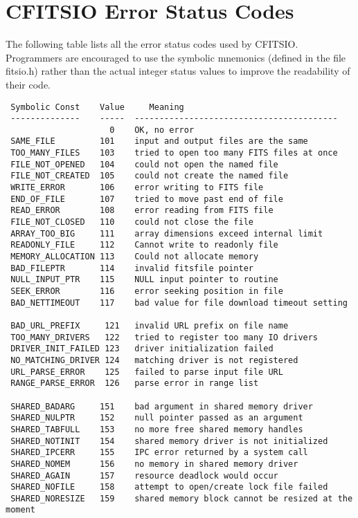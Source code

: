 \documentclass[11pt]{book}
\begin{document}
\chapter{CFITSIO Error Status Codes }

The following table lists all the error status codes used by CFITSIO.
Programmers are encouraged to use the symbolic mnemonics (defined in
the file fitsio.h) rather than the actual integer status values to
improve the readability of their code.

\begin{verbatim}
 Symbolic Const    Value     Meaning
 --------------    -----  -----------------------------------------
                     0    OK, no error
 SAME_FILE         101    input and output files are the same
 TOO_MANY_FILES    103    tried to open too many FITS files at once
 FILE_NOT_OPENED   104    could not open the named file
 FILE_NOT_CREATED  105    could not create the named file
 WRITE_ERROR       106    error writing to FITS file
 END_OF_FILE       107    tried to move past end of file
 READ_ERROR        108    error reading from FITS file
 FILE_NOT_CLOSED   110    could not close the file
 ARRAY_TOO_BIG     111    array dimensions exceed internal limit
 READONLY_FILE     112    Cannot write to readonly file
 MEMORY_ALLOCATION 113    Could not allocate memory
 BAD_FILEPTR       114    invalid fitsfile pointer
 NULL_INPUT_PTR    115    NULL input pointer to routine
 SEEK_ERROR        116    error seeking position in file
 BAD_NETTIMEOUT    117    bad value for file download timeout setting

 BAD_URL_PREFIX     121   invalid URL prefix on file name
 TOO_MANY_DRIVERS   122   tried to register too many IO drivers
 DRIVER_INIT_FAILED 123   driver initialization failed
 NO_MATCHING_DRIVER 124   matching driver is not registered
 URL_PARSE_ERROR    125   failed to parse input file URL
 RANGE_PARSE_ERROR  126   parse error in range list

 SHARED_BADARG     151    bad argument in shared memory driver
 SHARED_NULPTR     152    null pointer passed as an argument
 SHARED_TABFULL    153    no more free shared memory handles
 SHARED_NOTINIT    154    shared memory driver is not initialized
 SHARED_IPCERR     155    IPC error returned by a system call
 SHARED_NOMEM      156    no memory in shared memory driver
 SHARED_AGAIN      157    resource deadlock would occur
 SHARED_NOFILE     158    attempt to open/create lock file failed
 SHARED_NORESIZE   159    shared memory block cannot be resized at the moment


\end{verbatim}
\end{document}
